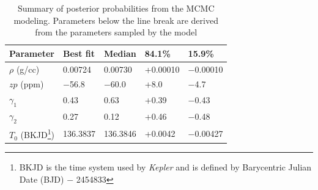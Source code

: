 \documentclass[apjl]{emulateapj}
\begin{document}
\begin{table}
\caption{Summary of posterior probabilities from the MCMC modeling. Parameters below the line break are derived from the parameters sampled by the model}\label{tab:results}
\begin{tabular}{l l l l l}
Parameter&Best fit& Median&84.1\%&15.9\%\\
\hline
%
$\rho$ (g/cc)			&	0.00724		&	0.00730		&	+0.00010		&	$-$0.00010	\\
$zp$	(ppm)			&	$-$56.8		&	$-$60.0		&	+8.0			&	$-$4.7		\\
$\gamma_1$			&	0.43			&	0.63			&	+0.39		&	$-$0.43		\\
$\gamma_2$			&	0.27			&	0.12			&	+0.46		&	$-$0.48		\\
$T_0$ (BKJD\footnote{BKJD is the time system used by \emph{Kepler} and is defined by Barycentric Julian Date (BJD) $-$ 2454833}) 	&	136.3837		&	136.3846		&	+0.0042		&	$-$0.00427	\\

\end{tabular}
\end{table}
\end{document}
